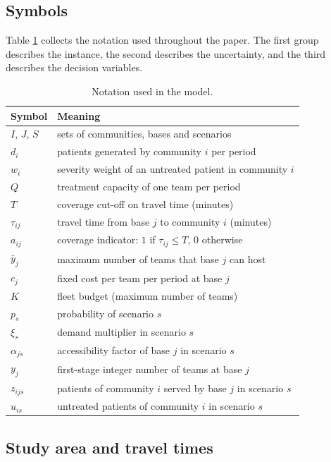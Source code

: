 \documentclass{apmcmthesis}
\begin{document}
\subsection{Symbols}

Table \ref{tab:notation} collects the notation used throughout the paper. The first group describes the instance, the second describes the uncertainty, and the third describes the decision variables.

\begin{table}[!ht]
\centering
\caption{Notation used in the model.}
\label{tab:notation}
\small
\begin{tabular}{ll}
\toprule
Symbol & Meaning \\
\midrule
$I$, $J$, $S$ & sets of communities, bases and scenarios \\
$d_i$ & patients generated by community $i$ per period \\
$w_i$ & severity weight of an untreated patient in community $i$ \\
$Q$ & treatment capacity of one team per period \\
$T$ & coverage cut-off on travel time (minutes) \\
$\tau_{ij}$ & travel time from base $j$ to community $i$ (minutes) \\
$a_{ij}$ & coverage indicator: $1$ if $\tau_{ij}\le T$, $0$ otherwise \\
$\bar y_j$ & maximum number of teams that base $j$ can host \\
$c_j$ & fixed cost per team per period at base $j$ \\
$K$ & fleet budget (maximum number of teams) \\
$p_s$ & probability of scenario $s$ \\
$\xi_s$ & demand multiplier in scenario $s$ \\
$\alpha_{js}$ & accessibility factor of base $j$ in scenario $s$ \\
$y_j$ & first-stage integer number of teams at base $j$ \\
$z_{ijs}$ & patients of community $i$ served by base $j$ in scenario $s$ \\
$u_{is}$ & untreated patients of community $i$ in scenario $s$ \\
\bottomrule
\end{tabular}
\end{table}

\subsection{Study area and travel times}
\end{document}
